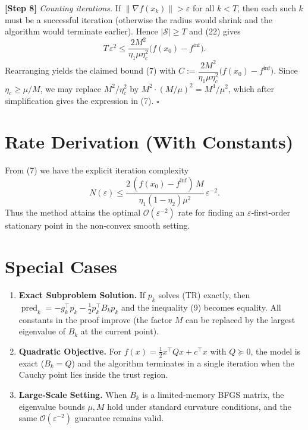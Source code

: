 \documentclass{article}
\begin{document}
\noindent\textbf{[Step 8]} \emph{Counting iterations.}
If $\|\nabla f(x_{k})\|>\varepsilon$ for all $k<T$, then each such $k$ must be a
successful iteration (otherwise the radius would shrink and the algorithm would
terminate earlier). Hence $\lvert\mathcal{S}\rvert\ge T$ and (22) gives
\[
T\,\varepsilon^{2}\le
\frac{2M^{2}}{\eta_{1}\mu\eta_{c}^{2}}\bigl(f(x_{0})-f^{\inf}\bigr).
\]
Rearranging yields the claimed bound (7) with
$C:=\dfrac{2M^{2}}{\eta_{1}\mu\eta_{c}^{2}}\bigl(f(x_{0})-f^{\inf}\bigr)$.
Since $\eta_{c}\ge\mu/M$, we may replace $M^{2}/\eta_{c}^{2}$ by $M^{2}\cdot
(M/\mu)^{2}=M^{4}/\mu^{2}$, which after simplification gives the expression in
(7). \hfill $\square$

\section*{Rate Derivation (With Constants)}
From (7) we have the explicit iteration complexity
\[
N(\varepsilon)\le
\frac{2\,(f(x_{0})-f^{\inf})\,M}{\eta_{1}(1-\eta_{2})\mu^{2}}\,
\varepsilon^{-2}.
\]
Thus the method attains the optimal $\mathcal{O}(\varepsilon^{-2})$ rate for
finding an $\varepsilon$‑first‑order stationary point in the non‑convex smooth
setting.

\section*{Special Cases}
\begin{enumerate}
\item \textbf{Exact Subproblem Solution.}
If $p_{k}$ solves (TR) exactly, then $\operatorname{pred}_{k}= -g_{k}^{\top}p_{k}
-\tfrac12p_{k}^{\top}B_{k}p_{k}$ and the inequality (9) becomes equality.
All constants in the proof improve (the factor $M$ can be replaced by the
largest eigenvalue of $B_{k}$ at the current point).

\item \textbf{Quadratic Objective.}
For $f(x)=\tfrac12 x^{\top}Qx+ c^{\top}x$ with $Q\succeq0$, the model is exact
($B_{k}=Q$) and the algorithm terminates in a single iteration when the Cauchy
point lies inside the trust region.

\item \textbf{Large‑Scale Setting.}
When $B_{k}$ is a limited‑memory BFGS matrix, the eigenvalue bounds
$\mu,M$ hold under standard curvature conditions, and the same
$\mathcal{O}(\varepsilon^{-2})$ guarantee remains valid.
\end{enumerate}
\end{document}
